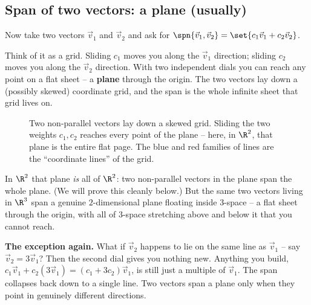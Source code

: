\subsection{Span of two vectors: a plane (usually)}

Now take two vectors $\vec{v}_1$ and $\vec{v}_2$ and ask for $\spn\{\vec{v}_1,\vec{v}_2\} = \set{c_1\vec{v}_1 + c_2\vec{v}_2}$.

Think of it as a grid. Sliding $c_1$ moves you along the $\vec{v}_1$ direction; sliding $c_2$ moves you along the $\vec{v}_2$ direction. With two independent dials you can reach any point on a flat sheet -- a \textbf{plane} through the origin. The two vectors lay down a (possibly skewed) coordinate grid, and the span is the whole infinite sheet that grid lives on.

\begin{figure}[H]
\centering
{}
\caption{Two non-parallel vectors lay down a skewed grid. Sliding the two weights $c_1,c_2$ reaches every point of the plane -- here, in $\R^2$, that plane is the entire flat page. The blue and red families of lines are the ``coordinate lines'' of the grid.}
\label{ch03:two-grid}
\end{figure}

In $\R^2$ that plane \emph{is} all of $\R^2$: two non-parallel vectors in the plane span the whole plane. (We will prove this cleanly below.) But the same two vectors living in $\R^3$ span a genuine $2$-dimensional plane floating inside $3$-space -- a flat sheet through the origin, with all of $3$-space stretching above and below it that you cannot reach.

\textbf{The exception again.} What if $\vec{v}_2$ happens to lie on the same line as $\vec{v}_1$ -- say $\vec{v}_2 = 3\vec{v}_1$? Then the second dial gives you nothing new. Anything you build, $c_1\vec{v}_1 + c_2(3\vec{v}_1) = (c_1 + 3c_2)\vec{v}_1$, is still just a multiple of $\vec{v}_1$. The span collapses back down to a single line. Two vectors span a plane only when they point in genuinely different directions.


